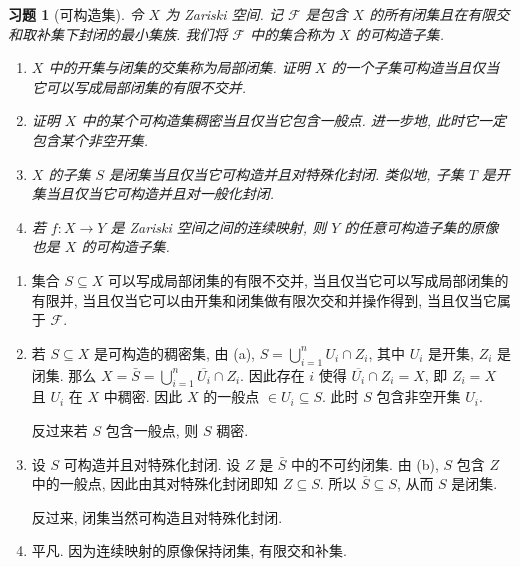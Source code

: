 \documentclass{article}
\theoremstyle{exercise}
\newtheorem{exercise}{习题}[section]
\newenvironment{proofc}{\proof}{\endproof}
\begin{document}
\begin{exercise}[可构造集]
  令 $X$ 为 Zariski 空间.
  记 $\mathcal{F}$ 是包含 $X$ 的所有闭集且在有限交和取补集下封闭的最小集族.
  我们将 $\mathcal{F}$ 中的集合称为 $X$ 的\emph{可构造子集}.

  \begin{enumerate}[label={(\alph*)}]
    \item $X$ 中的开集与闭集的交集称为\emph{局部闭集}.
          证明 $X$ 的一个子集可构造当且仅当它可以写成局部闭集的有限不交并.
    \item 证明 $X$ 中的某个可构造集稠密当且仅当它包含一般点.
          进一步地, 此时它一定包含某个非空开集.
    \item $X$ 的子集 $S$ 是闭集当且仅当它可构造并且对特殊化封闭.
          类似地, 子集 $T$ 是开集当且仅当它可构造并且对一般化封闭.
    \item 若 $f \colon X \to Y$ 是 Zariski 空间之间的连续映射,
          则 $Y$ 的任意可构造子集的原像也是 $X$ 的可构造子集.
  \end{enumerate}
\end{exercise}

\begin{proofc}
  \begin{enumerate}[label={(\alph*)}]
    \item 集合 $S \subseteq X$ 可以写成局部闭集的有限不交并,
          当且仅当它可以写成局部闭集的有限并,
          当且仅当它可以由开集和闭集做有限次交和并操作得到,
          当且仅当它属于 $\mathcal{F}$.
    \item 若 $S \subseteq X$ 是可构造的稠密集,
          由 (a), $S = \bigcup_{i = 1}^n U_i \cap Z_i$,
          其中 $U_i$ 是开集, $Z_i$ 是闭集.
          那么 $X = \bar{S} = \bigcup_{i = 1}^n \overline{U_i} \cap Z_i$.
          因此存在 $i$ 使得 $\overline{U_i} \cap Z_i = X$, 即 $Z_i = X$ 且 $U_i$ 在 $X$ 中稠密.
          因此 $X$ 的一般点 $\in U_i \subseteq S$.
          此时 $S$ 包含非空开集 $U_i$.

          反过来若 $S$ 包含一般点, 则 $S$ 稠密.
    \item 设 $S$ 可构造并且对特殊化封闭.
          设 $Z$ 是 $\bar{S}$ 中的不可约闭集.
          由 (b), $S$ 包含 $Z$ 中的一般点, 因此由其对特殊化封闭即知 $Z \subseteq S$.
          所以 $\bar{S} \subseteq S$, 从而 $S$ 是闭集.

          反过来, 闭集当然可构造且对特殊化封闭.
    \item 平凡. 因为连续映射的原像保持闭集, 有限交和补集.
          \qedhere
  \end{enumerate}
\end{proofc}
\end{document}
